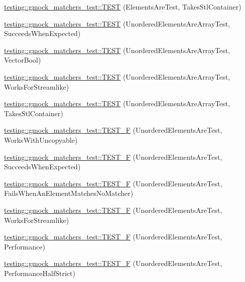 \begin{DoxyCompactItemize}
\item 
\hyperlink{namespacetesting_1_1gmock__matchers__test_a290280b9e89a57833c9fc706d153b98a}{testing\+::gmock\+\_\+matchers\+\_\+test\+::\+T\+E\+ST} (Elements\+Are\+Test, Takes\+Stl\+Container)
\item 
\hyperlink{namespacetesting_1_1gmock__matchers__test_adb7e47654f1536fc049243f765292825}{testing\+::gmock\+\_\+matchers\+\_\+test\+::\+T\+E\+ST} (Unordered\+Elements\+Are\+Array\+Test, Succeeds\+When\+Expected)
\item 
\hyperlink{namespacetesting_1_1gmock__matchers__test_a3d7df4fa0dd3e8247f4c2d4b02d801f0}{testing\+::gmock\+\_\+matchers\+\_\+test\+::\+T\+E\+ST} (Unordered\+Elements\+Are\+Array\+Test, Vector\+Bool)
\item 
\hyperlink{namespacetesting_1_1gmock__matchers__test_a1ff2a93a8f031a5b23dbc699a462043b}{testing\+::gmock\+\_\+matchers\+\_\+test\+::\+T\+E\+ST} (Unordered\+Elements\+Are\+Array\+Test, Works\+For\+Streamlike)
\item 
\hyperlink{namespacetesting_1_1gmock__matchers__test_aa3a960ec78e2b1e860c305f4598f39ec}{testing\+::gmock\+\_\+matchers\+\_\+test\+::\+T\+E\+ST} (Unordered\+Elements\+Are\+Array\+Test, Takes\+Stl\+Container)
\item 
\hyperlink{namespacetesting_1_1gmock__matchers__test_ab09132c3b991b8f104f3091370d2fe55}{testing\+::gmock\+\_\+matchers\+\_\+test\+::\+T\+E\+S\+T\+\_\+F} (Unordered\+Elements\+Are\+Test, Works\+With\+Uncopyable)
\item 
\hyperlink{namespacetesting_1_1gmock__matchers__test_a177c3db59da001df2441deb1ddb083af}{testing\+::gmock\+\_\+matchers\+\_\+test\+::\+T\+E\+S\+T\+\_\+F} (Unordered\+Elements\+Are\+Test, Succeeds\+When\+Expected)
\item 
\hyperlink{namespacetesting_1_1gmock__matchers__test_a62fd481b1160a667c785e6009ff87163}{testing\+::gmock\+\_\+matchers\+\_\+test\+::\+T\+E\+S\+T\+\_\+F} (Unordered\+Elements\+Are\+Test, Fails\+When\+An\+Element\+Matches\+No\+Matcher)
\item 
\hyperlink{namespacetesting_1_1gmock__matchers__test_a2affca2a152e4537c2f06518eaa2eac5}{testing\+::gmock\+\_\+matchers\+\_\+test\+::\+T\+E\+S\+T\+\_\+F} (Unordered\+Elements\+Are\+Test, Works\+For\+Streamlike)
\item 
\hyperlink{namespacetesting_1_1gmock__matchers__test_a074ca2babea203d1a54d69ff1fde5c59}{testing\+::gmock\+\_\+matchers\+\_\+test\+::\+T\+E\+S\+T\+\_\+F} (Unordered\+Elements\+Are\+Test, Performance)
\item 
\hyperlink{namespacetesting_1_1gmock__matchers__test_a4437de9d40efd87f73b738ef38c2d70f}{testing\+::gmock\+\_\+matchers\+\_\+test\+::\+T\+E\+S\+T\+\_\+F} (Unordered\+Elements\+Are\+Test, Performance\+Half\+Strict)

\end{DoxyCompactItemize}
